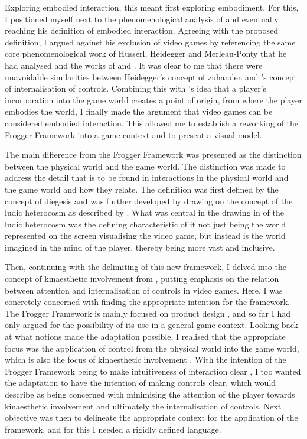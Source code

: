Exploring embodied interaction, this meant first exploring embodiment. For this, I positioned myself next to the phenomenological analysis of  and eventually reaching his definition of embodied interaction. Agreeing with the proposed definition, I argued against his exclusion of video games by referencing the same core phenomenological work of Husserl, Heidegger and Merleau-Ponty that he had analysed and the works of  and . It was clear to me that there were unavoidable similarities between Heidegger's concept of zuhanden and \citeauthor{calleja}'s \citeyear{calleja} concept of internalisation of controls. Combining this with \citeauthor{vella}'s \citeyear{vella} idea that a player's incorporation into the game world creates a point of origin, from where the player embodies the world, I finally made the argument that video games can be considered embodied interaction. This allowed me to establish a reworking of the Frogger Framework into a game context and to present a visual model.

The main difference from the Frogger Framework was presented as the distinction between the physical world and the game world. The distinction was made to address the detail that is to be found in interactions in the physical world and the game world and how they relate. The definition was first defined by the concept of diegesis \cite{bordwell} and was further developed by drawing on the concept of the ludic heterocosm as described by . What was central in the drawing in of the ludic heterocosm was the defining characteristic of it not just being the world represented on the screen visualising the video game, but instead is the world imagined in the mind of the player, thereby being more vast and inclusive.

Then, continuing with the delimiting of this new framework, I delved into the concept of kinaesthetic involvement from , putting emphasis on the relation between attention and internalisation of controls in video games. Here, I was concretely concerned with finding the appropriate intention for the framework. The Frogger Framework is mainly focused on product design \cite{frogger}, and so far I had only argued for the possibility of its use in a general game context. Looking back at what notions made the adaptation possible, I realised that the appropriate focus was the application of control from the physical world into the game world, which is also the focus of kinaesthetic involvement \cite{calleja}. With the intention of the Frogger Framework being to make intuitiveness of interaction clear \cite{frogger}, I too wanted the adaptation to have the intention of making controls clear, which  would describe as being concerned with minimising the attention of the player towards kinaesthetic involvement and ultimately the internalisation of controls. Next objective was then to delineate the appropriate context for the application of the framework, and for this I needed a rigidly defined language.

